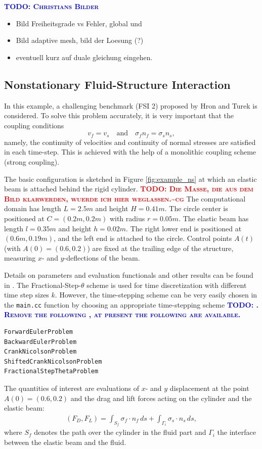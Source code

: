 \documentclass[prodmode,acmtoms]{acmsmall}
\numberwithin{equation}{section}
\newcommand{\todo}[1]{\textbf{\textsc{\textcolor{blue}{TODO: #1}}}}
\newcommand{\todocg}[1]{\textbf{\textsc{\textcolor{red}{TODO: #1\textasciitilde cg}}}}
\begin{document}
\todo{Christians Bilder}
\begin{itemize}
\item Bild Freiheitsgrade vs Fehler, global und 
\item Bild adaptive mesh, bild der Loesung (?)
\item eventuell kurz auf duale gleichung eingehen.
\end{itemize}

\subsection{Nonstationary Fluid-Structure Interaction}
In this example, a challenging benchmark (FSI 2)
proposed by Hron and Turek \cite{HrTu06b} is considered.
To solve this problem accurately, it is very important that 
the coupling conditions
\[
v_f = v_s \quad \text{and} \quad \sigma_f n_f = \sigma_s n_s, 
\]
namely, the continuity of velocities and continuity of normal stresses
are satisfied in each time-step. This is achieved with the help of 
a monolithic coupling scheme (strong coupling).

The basic configuration is 
sketched in Figure \ref{fig:example_ns} at which an elastic beam is attached 
behind the rigid cylinder. 
\todocg{Die Masse, die aus dem Bild klarwerden, wuerde ich hier weglassen.}
The computational domain has length $L=2.5m$ and height $H=0.41m$. The circle center
is positioned at $C=(0.2m,0.2m)$ with radius $r=0.05m$. The elastic beam has length
$l=0.35m$ and height $h=0.02m$. The right lower end is positioned at 
$(0.6m,0.19m)$, and
the left end is attached to the circle. 
Control points $A(t)$ (with $A(0) = (0.6,0.2)$) are fixed at the 
trailing edge of the structure, measuring $x$- and $y$-deflections of the beam.

Details 
on parameters and evaluation functionals and other results 
can be found in \cite{HrTu06b,BuSc06,DeHaeAnnBrVie10,Wi11}. 
The Fractional-Step-$\theta$ scheme is used for time discretization with
different time step sizes $k$. However, the time-stepping scheme can be 
very easily chosen in the \texttt{main.cc} function by choosing an appropriate 
time-stepping scheme
\todo{. Remove the following
, at present the following are available.}
\begin{lstlisting}
ForwardEulerProblem
BackwardEulerProblem
CrankNicolsonProblem
ShiftedCrankNicolsonProblem
FractionalStepThetaProblem
\end{lstlisting}


The quantities of interest are evaluations of 
$x$- and $y$ displacement at the point $A(0) = (0.6,0.2)$
and the drag and lift forces acting on the cylinder and the elastic beam:
\begin{align}
\label{drag_lift_forces}
(F_D , F_L) 
= {\int_{S_f} \sigma_f \cdot n_f \, ds + 
\int_{\Gamma_i} \sigma_s \cdot n_s \, ds},
\end{align}
where $S_{f}$ denotes the path over the cylinder in the fluid part and
$\Gamma_i$ the interface between the elastic beam and the 
fluid.
\end{document}
